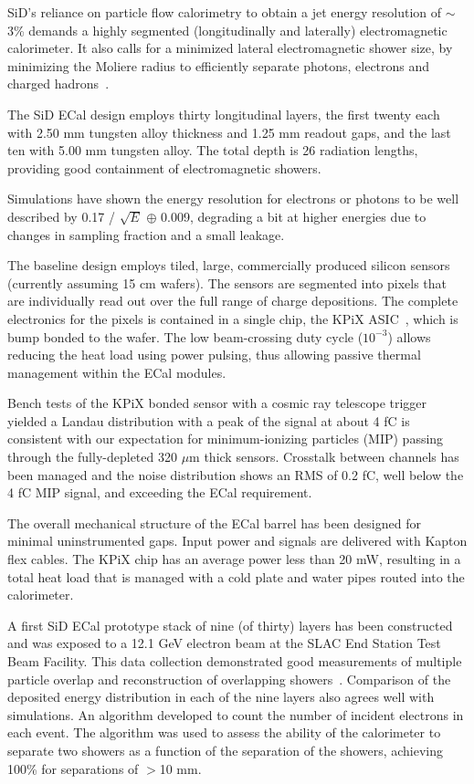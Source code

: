 SiD's reliance on particle flow calorimetry to obtain a jet energy resolution of  $\sim$3\% demands a highly segmented (longitudinally and laterally) electromagnetic calorimeter. It also calls for a minimized lateral electromagnetic shower size, by minimizing the Moliere radius to efficiently separate photons, electrons and charged hadrons~\cite{calor:2018}.

The SiD ECal design employs thirty longitudinal layers, the first twenty each with 2.50 mm tungsten alloy thickness and 1.25 mm readout gaps, and the last ten with 5.00 mm tungsten alloy.  The total depth is 26 radiation lengths, providing good containment of electromagnetic showers.

Simulations have shown the energy resolution for electrons or photons
to be well described by 0.17 / $\sqrt{E}$ $\oplus$ 0.009, degrading a
bit  at higher energies due to changes in sampling fraction and a small leakage.

The baseline design employs tiled, large, commercially produced silicon sensors (currently assuming 15 cm wafers). The sensors are segmented into pixels that are individually read out over the full range of charge depositions. The complete electronics for the pixels is contained in a single chip, the KPiX ASIC~\cite{Brau:2013yb}, which is bump bonded to the wafer. The low beam-crossing duty cycle ($10^{-3}$) allows reducing the heat load using power pulsing, thus allowing passive thermal management within the ECal modules.

Bench tests of the KPiX bonded sensor  with a cosmic ray telescope trigger yielded 
a Landau distribution with a peak of the signal at about 4 fC is consistent with our expectation for minimum-ionizing particles (MIP) passing through the fully-depleted 320 $\mu$m thick sensors. Crosstalk between channels has been managed and the 
 noise distribution shows an RMS of 0.2 fC, well below the 4 fC MIP signal, and exceeding the ECal requirement.

The overall mechanical structure of the ECal barrel has been designed for minimal uninstrumented gaps. Input power and signals are delivered with Kapton flex cables.
The KPiX chip has an average power less than 20 mW, resulting in a
total heat load  that is managed with a cold plate and water pipes routed 
into the calorimeter.

A first SiD ECal prototype stack of nine (of thirty) layers has been constructed and was exposed to a 12.1 GeV electron beam at the SLAC End Station Test Beam Facility. 
This data collection demonstrated good measurements of multiple particle overlap and reconstruction of overlapping showers~\cite{Steinhebel:2017qze}.  Comparison of the deposited energy distribution in each of the nine layers also agrees well with simulations.
An algorithm developed to count the number of incident electrons in each event. The algorithm was used to assess the ability of the calorimeter to separate two showers as a function of the separation of the showers, achieving 100\% for separations of $>$10 mm.



